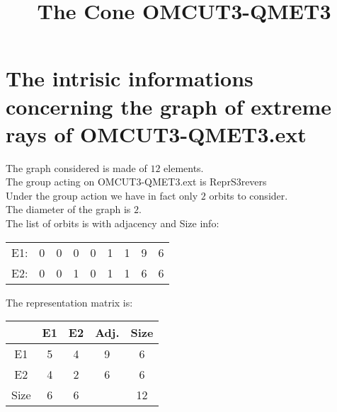 \documentclass[12pt]{article}
\title{The Cone OMCUT3-QMET3}
\begin{document}
\maketitle
\section{The intrisic informations concerning the graph of extreme rays of OMCUT3-QMET3.ext}
The graph considered is made of $12$ elements.\\
The group acting on OMCUT3-QMET3.ext is ReprS3revers\\
Under the group action we have in fact only $2$ orbits to consider.\\
The diameter of the graph is $2$.\\
The list of orbits is with adjacency and Size info:
\begin{center}
\scriptsize
\begin{tabular}{ccccccc|c|c}
E1:&0&0&0&0&1&1&9&6\\
E2:&0&0&1&0&1&1&6&6\\
\end{tabular}
\end{center}
The representation matrix is:
\begin{center}
\scriptsize
\begin{tabular}{|c|cc|c|c|}
\hline
&E1&E2&Adj.&Size\\
\hline
E1& 5& 4&9&6\\
E2& 4& 2&6&6\\
\hline
Size&6&6&&12\\
\hline
\end{tabular}
\end{center}
\end{document}
